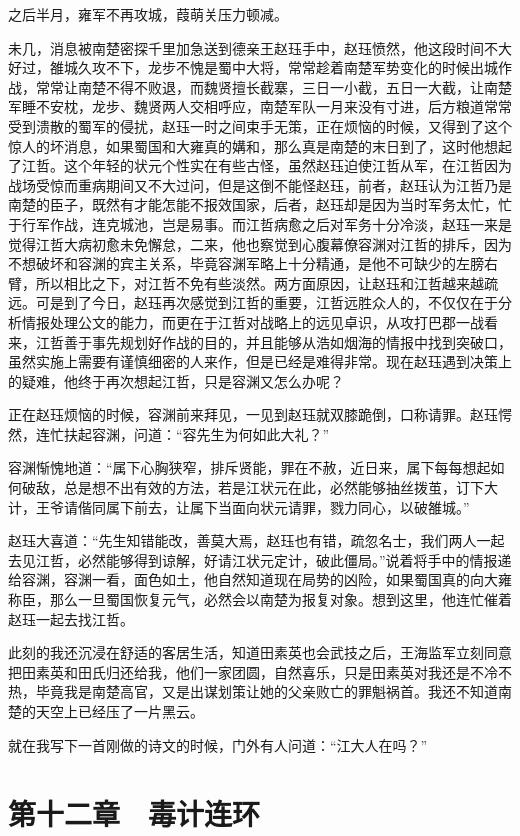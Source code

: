 之后半月，雍军不再攻城，葭萌关压力顿减。

未几，消息被南楚密探千里加急送到德亲王赵珏手中，赵珏愤然，他这段时间不大好过，雒城久攻不下，龙步不愧是蜀中大将，常常趁着南楚军势变化的时候出城作战，常常让南楚不得不败退，而魏贤擅长截寨，三日一小截，五日一大截，让南楚军睡不安枕，龙步、魏贤两人交相呼应，南楚军队一月来没有寸进，后方粮道常常受到溃散的蜀军的侵扰，赵珏一时之间束手无策，正在烦恼的时候，又得到了这个惊人的坏消息，如果蜀国和大雍真的媾和，那么真是南楚的末日到了，这时他想起了江哲。这个年轻的状元个性实在有些古怪，虽然赵珏迫使江哲从军，在江哲因为战场受惊而重病期间又不大过问，但是这倒不能怪赵珏，前者，赵珏认为江哲乃是南楚的臣子，既然有才能怎能不报效国家，后者，赵珏却是因为当时军务太忙，忙于行军作战，连克城池，岂是易事。而江哲病愈之后对军务十分冷淡，赵珏一来是觉得江哲大病初愈未免懈怠，二来，他也察觉到心腹幕僚容渊对江哲的排斥，因为不想破坏和容渊的宾主关系，毕竟容渊军略上十分精通，是他不可缺少的左膀右臂，所以相比之下，对江哲不免有些淡然。两方面原因，让赵珏和江哲越来越疏远。可是到了今日，赵珏再次感觉到江哲的重要，江哲远胜众人的，不仅仅在于分析情报处理公文的能力，而更在于江哲对战略上的远见卓识，从攻打巴郡一战看来，江哲善于事先规划好作战的目的，并且能够从浩如烟海的情报中找到突破口，虽然实施上需要有谨慎细密的人来作，但是已经是难得非常。现在赵珏遇到决策上的疑难，他终于再次想起江哲，只是容渊又怎么办呢？

正在赵珏烦恼的时候，容渊前来拜见，一见到赵珏就双膝跪倒，口称请罪。赵珏愕然，连忙扶起容渊，问道：“容先生为何如此大礼？”

容渊惭愧地道：“属下心胸狭窄，排斥贤能，罪在不赦，近日来，属下每每想起如何破敌，总是想不出有效的方法，若是江状元在此，必然能够抽丝拨茧，订下大计，王爷请偕同属下前去，让属下当面向状元请罪，戮力同心，以破雒城。”

赵珏大喜道：“先生知错能改，善莫大焉，赵珏也有错，疏忽名士，我们两人一起去见江哲，必然能够得到谅解，好请江状元定计，破此僵局。”说着将手中的情报递给容渊，容渊一看，面色如土，他自然知道现在局势的凶险，如果蜀国真的向大雍称臣，那么一旦蜀国恢复元气，必然会以南楚为报复对象。想到这里，他连忙催着赵珏一起去找江哲。

此刻的我还沉浸在舒适的客居生活，知道田素英也会武技之后，王海监军立刻同意把田素英和田氏归还给我，他们一家团圆，自然喜乐，只是田素英对我还是不冷不热，毕竟我是南楚高官，又是出谋划策让她的父亲败亡的罪魁祸首。我还不知道南楚的天空上已经压了一片黑云。

就在我写下一首刚做的诗文的时候，门外有人问道：“江大人在吗？”

\chapter{第十二章　毒计连环}

